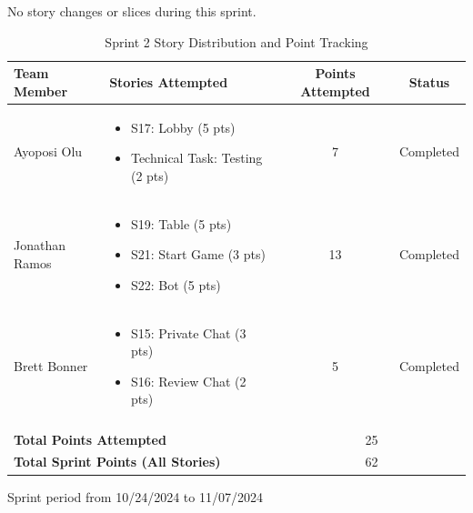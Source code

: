 \begin{table}[h]
\centering
No story changes or slices during this sprint.

\caption{Sprint 2 Story Distribution and Point Tracking}
\begin{tabular}{|p{3cm}|p{6cm}|c|c|}
\hline
\textbf{Team Member} & \textbf{Stories Attempted} & \textbf{Points Attempted} & \textbf{Status} \\
\hline
Ayoposi Olu & 
\begin{itemize}
    \item S17: Lobby (5 pts)
    \item Technical Task: Testing (2 pts)
\end{itemize} & 
7 & 
Completed \\
\hline
Jonathan Ramos & 
\begin{itemize}
    \item S19: Table (5 pts)
    \item S21: Start Game (3 pts)
    \item S22: Bot (5 pts)
\end{itemize}& 
13 & 
Completed \\
\hline
Brett Bonner & 
\begin{itemize}
    \item S15: Private Chat (3 pts)
    \item S16: Review Chat (2 pts)
\end{itemize} & 
5 & 
Completed \\
\hline
\multicolumn{4}{|c|}{} \\
\hline
\multicolumn{2}{|l|}{\textbf{Total Points Attempted}} & \multicolumn{2}{c|}{25} \\
\hline
\multicolumn{2}{|l|}{\textbf{Total Sprint Points (All Stories)}} & \multicolumn{2}{c|}{62} \\
\hline
\end{tabular}

\vspace{0.5cm}
\begin{center}
\small{Sprint period from 10/24/2024 to 11/07/2024}
\end{center}
\end{table}

